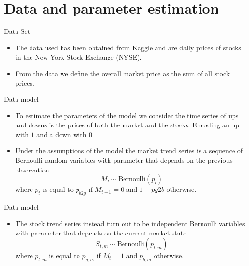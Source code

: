 \documentclass{beamer}
\begin{document}
	\section{Data and parameter estimation}
		\begin{frame}{Data Set}
		\begin{itemize}
			\item The data used has been obtained from \hyperlink{https://www.kaggle.com/dgawlik/nyse\#securities.csv}{Kaggle} and are daily prices of stocks in the New York Stock Exchange (NYSE).
			\item From the data we define the overall market price as the sum of all stock prices.
		\end{itemize}
		\end{frame}
	
	\begin{frame}{Data model}
	\begin{itemize}
		\item To estimate the parameters of the model we consider the time series of ups and downs is the prices of both the market and the stocks. Encoding an up with $1$ and a down with $0$.
		\item  Under the assumptions of the model the market trend series is a sequence of Bernoulli random variables with parameter that depends on the previous observation.
							$$M_t \sim \text{Bernoulli}(p_t)$$
					 where $p_t$ is equal to $p_{b2g}$ if $M_{t-1} = 0$ and $1 - p{g2b}$ otherwise. 
		
	\end{itemize}
	\end{frame}

	\begin{frame}{Data model}
	\begin{itemize}
		\item The stock trend series instead turn out to be independent Bernoulli variables with parameter that depends on the current market state
				$$S_{t,m} \sim \text{Bernoulli}(p_{t,m})$$
			  where $p_{t,m}$ is equal to $p_{g,m}$ if $M_t = 1$ and $p_{b,m}$ otherwise.
	\end{itemize}
	\end{frame}
	
\end{document}
